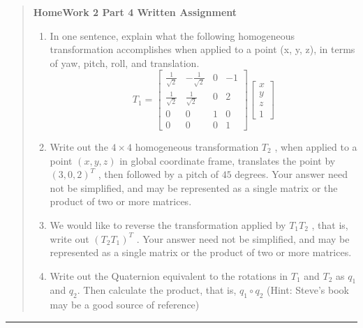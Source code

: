 \documentclass[11pt]{article}
\begin{document}



\begin{quote}
{\Large \textbf{HomeWork 2 Part 4 Written Assignment}}\\

\begin{enumerate}[1.]
    \item
    In one sentence, explain what the following homogeneous transformation accomplishes
    when applied to a point (x, y, z), in terms of yaw, pitch, roll, and translation.
    \[
        T_1 =
        \begin{bmatrix}
            \frac{1}{\sqrt{2}} & -\frac{1}{\sqrt{2}} & 0 & -1\\
            \frac{1}{\sqrt{2}} & \frac{1}{\sqrt{2}} & 0 & 2\\
            0 & 0 & 1 & 0\\
            0 & 0 & 0 & 1
        \end{bmatrix}
        \begin{bmatrix}
            x\\
            y\\
            z\\
            1
        \end{bmatrix}
    \]
    \item
    Write out the $4 \times 4$ homogeneous transformation $T_2$
    , when applied to a point $(x, y ,z)$ in
    global coordinate frame, translates the point by $(3, 0, 2) ^ {T}$ , then followed by a pitch of $45$
    degrees. Your answer need not be simplified, and may be represented as a single
    matrix or the product of two or more matrices.
    \item
    We would like to reverse the transformation applied by $T_1T_2$ , that is, write out
    $(T_2 T_1)^ T$ . Your answer need not be simplified, and may be represented as a single
    matrix or the product of two or more matrices.
    \item
    Write out the Quaternion equivalent to the rotations in $T_1$ and $T_2$ as $q_1$ and $q_2$. 
    Then calculate the product, that is, $q_1 \circ q_2$ (Hint: Steve’s book may be a good source of
    reference)
\end{enumerate}
\end{quote}
\hrule
\end{document}
